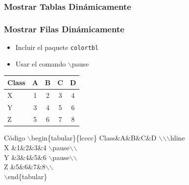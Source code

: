\documentclass[aspectratio=1610]{beamer}%
\begin{document}
\subsubsection{Mostrar Tablas Dinámicamente}
\begin{frame}
\frametitle{\textbf{Mostrar Filas Dinámicamente}}
\justifying
 \begin{itemize}\justifying
  \item Incluir el paquete \texttt{colortbl}
  \item Usar el comando $\backslash$pause
\end{itemize}

\begin{center}
\begin{tabular}{lcccc} 
Class&A&B&C&D \\\hline 
 X &1&2&3&4 \pause\\ 
Y &3&4&5&6 \pause\\
Z &5&6&7&8\\
\end{tabular}
\end{center}

\begin{exampleblock}{Código}
$\backslash$begin\{tabular\}\{lcccc\} 
Class\&A\&B\&C\&D $\backslash$$\backslash$$\backslash$hline \\
 X \&1\&2\&3\&4 $\backslash$pause$\backslash$$\backslash$\\ 
Y \&3\&4\&5\&6 $\backslash$pause$\backslash$$\backslash$\\
Z \&5\&6\&7\&8$\backslash$$\backslash$\\
$\backslash$end\{tabular\}
\end{exampleblock}

\end{frame}
\end{document}
